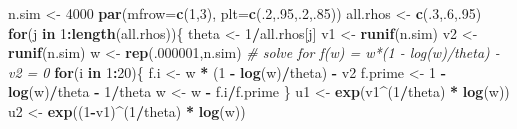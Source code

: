 \documentclass[
  12pt,
]{book}
\newenvironment{Shaded}{\begin{snugshade}}{\end{snugshade}}
\newcommand{\AttributeTok}[1]{\textcolor[rgb]{0.13,0.29,0.53}{#1}}
\newcommand{\CommentTok}[1]{\textcolor[rgb]{0.56,0.35,0.01}{\textit{#1}}}
\newcommand{\ControlFlowTok}[1]{\textcolor[rgb]{0.13,0.29,0.53}{\textbf{#1}}}
\newcommand{\DecValTok}[1]{\textcolor[rgb]{0.00,0.00,0.81}{#1}}
\newcommand{\FunctionTok}[1]{\textcolor[rgb]{0.13,0.29,0.53}{\textbf{#1}}}
\newcommand{\NormalTok}[1]{#1}
\newcommand{\OtherTok}[1]{\textcolor[rgb]{0.56,0.35,0.01}{#1}}
\newcommand{\SpecialCharTok}[1]{\textcolor[rgb]{0.81,0.36,0.00}{\textbf{#1}}}
\theoremstyle{definition}
\theoremstyle{definition}
\theoremstyle{definition}
\theoremstyle{definition}
\theoremstyle{remark}
\begin{document}
\begin{Shaded}
\begin{Highlighting}[]
\NormalTok{n.sim }\OtherTok{\textless{}{-}} \DecValTok{4000}
\FunctionTok{par}\NormalTok{(}\AttributeTok{mfrow=}\FunctionTok{c}\NormalTok{(}\DecValTok{1}\NormalTok{,}\DecValTok{3}\NormalTok{),}
    \AttributeTok{plt=}\FunctionTok{c}\NormalTok{(.}\DecValTok{2}\NormalTok{,.}\DecValTok{95}\NormalTok{,.}\DecValTok{2}\NormalTok{,.}\DecValTok{85}\NormalTok{))}
\NormalTok{all.rhos }\OtherTok{\textless{}{-}} \FunctionTok{c}\NormalTok{(.}\DecValTok{3}\NormalTok{,.}\DecValTok{6}\NormalTok{,.}\DecValTok{95}\NormalTok{)}
\ControlFlowTok{for}\NormalTok{(j }\ControlFlowTok{in} \DecValTok{1}\SpecialCharTok{:}\FunctionTok{length}\NormalTok{(all.rhos))\{}
\NormalTok{  theta }\OtherTok{\textless{}{-}} \DecValTok{1}\SpecialCharTok{/}\NormalTok{all.rhos[j]}
\NormalTok{  v1 }\OtherTok{\textless{}{-}} \FunctionTok{runif}\NormalTok{(n.sim)}
\NormalTok{  v2 }\OtherTok{\textless{}{-}} \FunctionTok{runif}\NormalTok{(n.sim)}
\NormalTok{  w }\OtherTok{\textless{}{-}} \FunctionTok{rep}\NormalTok{(.}\DecValTok{000001}\NormalTok{,n.sim)}
  \CommentTok{\# solve for f(w) = w*(1 {-} log(w)/theta) {-} v2 = 0}
  \ControlFlowTok{for}\NormalTok{(i }\ControlFlowTok{in} \DecValTok{1}\SpecialCharTok{:}\DecValTok{20}\NormalTok{)\{}
\NormalTok{    f.i }\OtherTok{\textless{}{-}}\NormalTok{ w }\SpecialCharTok{*}\NormalTok{ (}\DecValTok{1} \SpecialCharTok{{-}} \FunctionTok{log}\NormalTok{(w)}\SpecialCharTok{/}\NormalTok{theta) }\SpecialCharTok{{-}}\NormalTok{ v2}
\NormalTok{    f.prime }\OtherTok{\textless{}{-}} \DecValTok{1} \SpecialCharTok{{-}} \FunctionTok{log}\NormalTok{(w)}\SpecialCharTok{/}\NormalTok{theta }\SpecialCharTok{{-}} \DecValTok{1}\SpecialCharTok{/}\NormalTok{theta}
\NormalTok{    w }\OtherTok{\textless{}{-}}\NormalTok{ w }\SpecialCharTok{{-}}\NormalTok{ f.i}\SpecialCharTok{/}\NormalTok{f.prime}
\NormalTok{  \}}
\NormalTok{  u1 }\OtherTok{\textless{}{-}} \FunctionTok{exp}\NormalTok{(v1}\SpecialCharTok{\^{}}\NormalTok{(}\DecValTok{1}\SpecialCharTok{/}\NormalTok{theta) }\SpecialCharTok{*} \FunctionTok{log}\NormalTok{(w))}
\NormalTok{  u2 }\OtherTok{\textless{}{-}} \FunctionTok{exp}\NormalTok{((}\DecValTok{1}\SpecialCharTok{{-}}\NormalTok{v1)}\SpecialCharTok{\^{}}\NormalTok{(}\DecValTok{1}\SpecialCharTok{/}\NormalTok{theta) }\SpecialCharTok{*} \FunctionTok{log}\NormalTok{(w))}


\end{Highlighting}
\end{Shaded}
\end{document}

